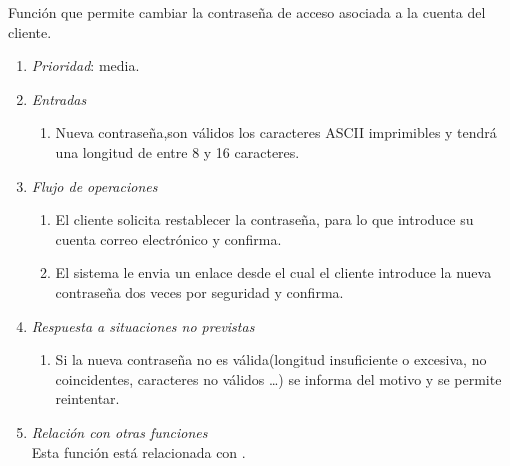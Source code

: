 

	Función que permite cambiar la contraseña de acceso asociada a la cuenta del cliente.
		
	\begin{enumerate}
		\item \textit{Prioridad}: media.
		\item \textit{Entradas}
		\begin{enumerate}
			\item Nueva contraseña,son válidos los caracteres ASCII imprimibles y tendrá una longitud de entre 8 y 16 caracteres.
		\end{enumerate}
		\item \textit{Flujo de operaciones}
		\begin{enumerate}
			\item El cliente solicita restablecer la contraseña, para lo que introduce su cuenta correo electrónico y confirma.
			\item El sistema le envia un enlace desde el cual el cliente introduce la nueva contraseña dos veces por seguridad y confirma.
		\end{enumerate}
		\item \textit{Respuesta a situaciones no previstas}
		\begin{enumerate}
			\item Si la nueva contraseña no es válida(longitud insuficiente o excesiva, no coincidentes, caracteres no válidos \ldots) se informa del motivo y se permite reintentar.
		\end{enumerate}
		\item \textit{Relación con otras funciones}\\
			Esta función está relacionada con .
\end{enumerate}

